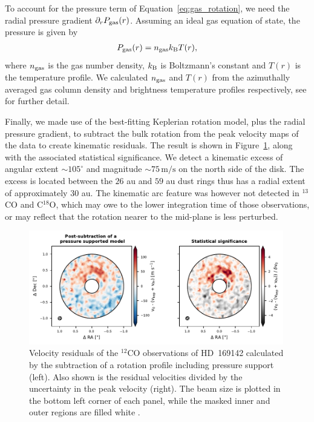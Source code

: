 To account for the pressure term of Equation~\eqref{eq:gas_rotation}, we need the radial pressure gradient $\partial_r P_{\rm gas}(r)$.
Assuming an ideal gas equation of state, the pressure is given by 
\begin{align}
    P_{\rm gas}(r) = n_{\rm gas} k_{\rm B} T(r),
\end{align}
where $n_{\rm gas}$ is the gas number density, $k_{\rm B}$ is Boltzmann's constant and $T(r)$ is the temperature profile.
We calculated $n_{\rm gas}$ and $T(r)$ from the azimuthally averaged gas column density and brightness temperature profiles respectively, see \citet{garg2022} for further detail.

Finally, we made use of the best-fitting Keplerian rotation model, plus the radial pressure gradient, to subtract the bulk rotation from the peak velocity maps of the data to create kinematic residuals.
The result is shown in Figure~\ref{fig:garg_arc}, along with the associated statistical significance.
We detect a kinematic excess of angular extent $\sim 105^\circ$ and magnitude $\sim 75 \, \mathrm{m/s}$ on the north side of the disk.
The excess is located between the $26$ au and $59$ au dust rings thus has a radial extent of approximately $30$ au.
The kinematic arc feature was however not detected in $^{13}$CO and C$^{18}$O, which may owe to the lower integration time of those observations, or may reflect that the rotation nearer to the mid-plane is less perturbed.

\begin{figure}
    \centering
    \includegraphics[width = 0.99\textwidth]{figures/garg_arc.pdf}
    \caption{Velocity residuals of the $^{12}$CO observations of HD~169142 calculated by the subtraction of a rotation profile including pressure support (left). Also shown is the residual velocities divided by the uncertainty in the peak velocity (right). The beam size is plotted in the bottom left corner of each panel, while the masked inner and outer regions are filled white \citep{garg2022}.}
    \label{fig:garg_arc}
\end{figure}

